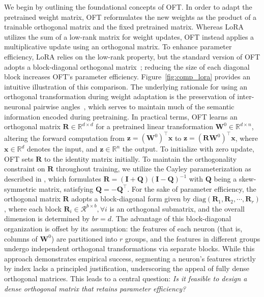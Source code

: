 We begin by outlining the foundational concepts of OFT. In order to adapt the pretrained weight matrix, OFT reformulates the new weights as the product of a trainable orthogonal matrix and the fixed pretrained matrix. Whereas LoRA utilizes the sum of a low-rank matrix for weight updates, OFT instead applies a multiplicative update using an orthogonal matrix. To enhance parameter efficiency, LoRA relies on the low-rank property, but the standard version of OFT adopts a block-diagonal orthogonal matrix~\cite{qiu2023controlling}; reducing the size of each diagonal block increases OFT’s parameter efficiency. Figure~\ref{fig:comp_lora} provides an intuitive illustration of this comparison. The underlying rationale for using an orthogonal transformation during weight adaptation is the preservation of inter-neuronal pairwise angles~\cite{liu2018learning,liu2021orthogonal,qiu2023controlling}, which serves to maintain much of the semantic information encoded during pretraining. In practical terms, OFT learns an orthogonal matrix $\bm{R}\in\mathbb{R}^{d\times d}$ for a pretrained linear transformation $\bm{W}^0\in\mathbb{R}^{d\times n}$, altering the forward computation from $\bm{z}=(\bm{W}^0)^\top\bm{x}$ to $\bm{z}=(\bm{R}\bm{W}^0)^\top\bm{x}$, where $\bm{x}\in\mathbb{R}^{d}$ denotes the input, and $\bm{z}\in\mathbb{R}^{n}$ the output. To initialize with zero update, OFT sets $\bm{R}$ to the identity matrix initially. To maintain the orthogonality constraint on $\bm{R}$ throughout training, we utilize the Cayley parameterization as described in \cite{qiu2023controlling,liu2021orthogonal}, which formulates $\bm{R}=(\bm{I}+\bm{Q})(\bm{I}-\bm{Q})^{-1}$ with $\bm{Q}$ being a skew-symmetric matrix, satisfying $\bm{Q}=-\bm{Q}^\top$. For the sake of parameter efficiency, the orthogonal matrix $\bm{R}$ adopts a block-diagonal form given by $\text{diag}(\bm{R}_1,\bm{R}_2,\cdots,\bm{R}_r)$, where each block $\bm{R}_i\in\mathcal{R}^{b\times b},\forall i$ is an orthogonal submatrix, and the overall dimension is determined by $br=d$. The advantage of this block-diagonal organization is offset by its assumption: the features of each neuron (that is, columns of $\bm{W}^0$) are partitioned into $r$ groups, and the features in different groups undergo independent orthogonal transformations via separate blocks. While this approach demonstrates empirical success, segmenting a neuron's features strictly by index lacks a principled justification, underscoring the appeal of fully dense orthogonal matrices. This leads to a central question: \emph{Is it feasible to design a dense orthogonal matrix that retains parameter efficiency?}

